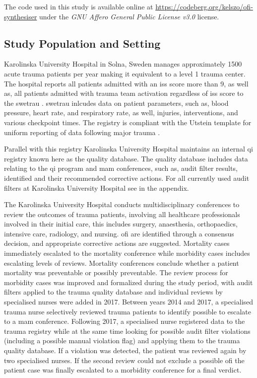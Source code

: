 \documentclass[12pt, letterpaper]{article}
\begin{document}
The code used in this study is available online at \url{https://codeberg.org/kelszo/ofi-synthesiser} under the \textit{GNU Affero General Public License v3.0} license.

\subsection{Study Population and Setting}
Karolinska University Hospital in Solna, Sweden manages approximately 1500 acute trauma patients per year making it equivalent to a level 1 trauma center. The hospital reports all patients admitted with an \acrfull{iss} score more than 9, as well as, all patients admitted with trauma team activation regardless of \acrshort{iss} score to the \acrfull{swetrau} \cite{swetrau}. \acrshort{swetrau} inlcudes data on patient parameters, such as, blood pressure, heart rate, and respiratory rate, as well, injuries, interventions, and various checkpoint times. The registry is compliant with the Utstein template for uniform reporting of data following major trauma \cite{ringdal_utstein_2008}.

Parallel with this registry Karolinska University Hospital maintains an internal \acrshort{qi} registry known here as the quality database. The quality database includes data relating to the \acrshort{qi} program and \acrshort{mam} conferences, such as, audit filter results, identified  and their recommended corrective actions. For all currently used audit filters at Karolinska University Hospital see  in the appendix.

The Karolinska University Hospital conducts multidisciplinary conferences to review the outcomes of trauma patients, involving all healthcare professionals involved in their initial care, this includes surgery, anaesthesia, orthopaedics, intensive care, radiology, and nursing. \acrshort{ofi} are identified through a consensus decision, and appropriate corrective actions are suggested. Mortality cases immediately escalated to the mortality conference while morbidity cases includes escalating levels of reviews. Mortality conferences conclude whether a patient mortality was preventable or possibly preventable. The review process for morbidity cases was improved and formalized during the study period, with audit filters applied to the trauma quality database and individual reviews by specialised nurses were added in 2017. Between years 2014 and 2017, a specialised trauma nurse selectively reviewed trauma patients to identify possible  to escalate to a \acrshort{mam} conference. Following 2017, a specialised nurse registered data to the trauma registry while at the same time looking for possible audit filter violations (including a possible manual violation flag) and applying them to the trauma quality database. If a violation was detected, the patient was reviewed again by two specialised nurses. If the second review could not exclude a possible \acrshort{ofi} the patient case was finally escalated to a morbidity conference for a final verdict.
\end{document}
